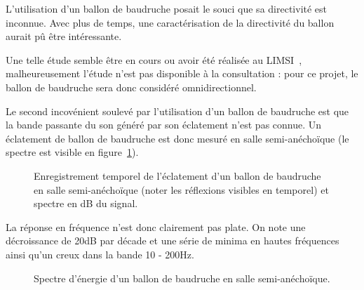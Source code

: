 L'utilisation d'un ballon de baudruche posait le souci que sa directivité est inconnue. Avec plus de temps, une
caractérisation de la directivité du ballon aurait pû être intéressante.

Une telle étude semble être en cours ou avoir été réalisée au LIMSI~\cite{Bru10}, malheureusement l'étude n'est pas
disponible à la consultation : pour ce projet, le ballon de baudruche sera donc considéré omnidirectionnel.

Le second incovénient soulevé par l'utilisation d'un ballon de baudruche est que la bande passante du son généré par
son éclatement n'est pas connue. Un éclatement de ballon de baudruche est donc mesuré en salle semi-anéchoïque (le
spectre est visible en figure~\ref{spk_ballon_anecho}).

\begin{figure}[h!]
\caption{\label{spk_ballon_anecho}Enregistrement temporel de l'éclatement d'un ballon de baudruche en salle
semi-anéchoïque (noter les réflexions visibles en temporel) et spectre en dB du signal.}
\end{figure}

La réponse en fréquence n'est donc clairement pas plate. On note une décroissance de 20dB par décade et une série de
minima en hautes fréquences ainsi qu'un creux dans la bande 10 - 200Hz.

\begin{figure}[h!]
\caption{\label{ballon_energie}Spectre d'énergie d'un ballon de baudruche en salle semi-anéchoïque.}
\end{figure}


